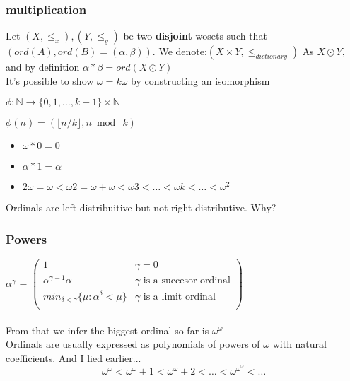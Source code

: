 \documentclass{article}
\newcommand{\N}{\mathbb{N}}
\begin{document}
\subsubsection{multiplication}
Let $(X,\le_x),(Y,\le_y)$ be two \textbf{disjoint} wosets such that $(ord(A),ord(B)=(\alpha,\beta))$. We denote:$(X\times Y,\le_{dictionary})$
As $X\odot Y$, and by definition $\alpha *\beta=ord(X\odot Y)$\\
It's possible to show $\omega=k\omega$ by constructing an isomorphism
\begin{center}$\phi:\N\rightarrow\{0,1,\ldots,k-1\}\times\N$\end{center}
\begin{center}$\phi(n)=(\lfloor{n/k}\rfloor,n \bmod \ k)$\end{center}
\begin{itemize}
\item $\omega*0=0$
\item $\alpha*1=\alpha$
\item $2\omega=\omega<\omega 2=\omega+\omega<\omega 3<\ldots<\omega k<\ldots<\omega^2$
\end{itemize}
Ordinals are left distribuitive but not right distributive. Why?
\subsubsection{Powers}
$\alpha^\gamma$ = 
$\begin{pmatrix}
	1 & \gamma=0\\
	\alpha^{\gamma-1}\alpha & \gamma\text{ is a succesor ordinal}\\
	min_{\delta<\gamma}\{\mu:\alpha^\delta<\mu\} & \gamma\text{ is a limit ordinal}\\
\end{pmatrix}$\\\\
From that we infer the biggest ordinal so far is $\omega^\omega$\\
Ordinals are usually expressed as polynomials of powers of $\omega$ with natural coefficients. And I lied earlier...
\[
\omega^\omega<\omega^\omega+1<\omega^\omega+2<\ldots<\omega^{\omega^\omega}<\ldots
\]
\end{document}
